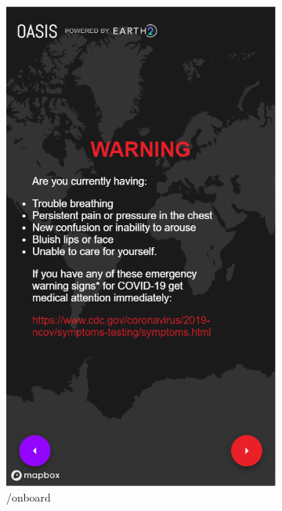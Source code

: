 \documentclass{ucsdreport}
\begin{document}
\begin{figure}[H]
	\begin{subfigure}{.33\textwidth}
	    \centering
		\includegraphics[scale = 0.47]{images/update4.PNG}
		\caption{/onboard}
	\end{subfigure}
	\begin{subfigure}{.33\textwidth}
	    \centering

\end{subfigure}
\end{figure}
\end{document}
